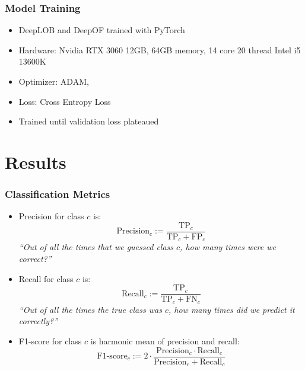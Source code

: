 \documentclass[handout]{beamer}
\begin{document}
\begin{frame}
    \frametitle{Model Training}
     \begin{itemize}
         \item DeepLOB and DeepOF trained with PyTorch {\color{blue}\cite{PYTORCH2017}}
        \item Hardware: Nvidia RTX 3060 12GB, 64GB memory, 14 core 20 thread Intel i5 13600K
        \item Optimizer: ADAM, {\color{blue}\cite{ADAM2017}}
        \item Loss: Cross Entropy Loss
        \item Trained until validation loss plateaued
    \end{itemize}
    
\end{frame}

\section{Results}
\begin{frame}
    \frametitle{Classification Metrics}
     \footnotesize
     \begin{itemize}
        \item Precision for class $ c $ is:
            \begin{equation}
            \text{Precision}_c := \frac{\text{TP}_c}{\text{TP}_c + \text{FP}_c}
            \end{equation}
        \textit{``Out of all the times that we guessed class $c$, how many times were we correct?''}
        \item Recall for class $c$ is:
            \begin{equation}
            \text{Recall}_c := \frac{\text{TP}_c}{\text{TP}_c + \text{FN}_c}
            \end{equation}
            \textit{``Out of all the times the true class was $c$, how many times did we predict it correctly?''}
        \item F1-score for class $ c $ is harmonic mean of precision and recall:
            \begin{equation}
            \text{F1-score}_c := 2 \cdot \frac{\text{Precision}_c \cdot \text{Recall}_c}{\text{Precision}_c + \text{Recall}_c}
            \end{equation}
    \end{itemize}
\end{frame}
\end{document}

